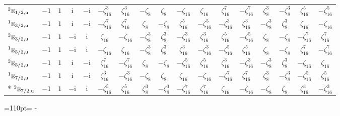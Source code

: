 \documentclass[10pt,a4paper]{article}
\newcommand{\needspace}[1]{\par\penalty-100\begingroup\dimen0=#1\relax\dimen2=\pagegoal
  \advance\dimen2-\pagetotal\ifdim\dimen0>\dimen2\relax\ifdim\dimen2>0pt\vfil\break\fi\fi
  \endgroup}
\numberwithin{equation}{section}
\newcommand{\irr}[1]{\text{\normalfont\scshape #1}}
\newcommand{\conjpair}[1]{{}^{#1}}
\newcommand{\ptag}[1]{\mathrm{#1}}
\newcommand{\iunit}{\mathrm{i}}
\newcommand{\rootunity}[1]{\zeta_{#1}}
\begin{document}
{\begin{longtable}{@{}lcccccccccccccccc@{}}
$\conjpair{2}\irr{e}_{1/2,\ptag{u}}$ & $-1$ & $1$ & $\iunit{}$ & $-\iunit{}$ & $-\rootunity{16}^{3}$ & $\rootunity{16}^{3}$ & $-\rootunity{8}$ & $\rootunity{8}$ & $-\rootunity{16}$ & $\rootunity{16}$ & $\rootunity{16}^{7}$ & $-\rootunity{16}^{7}$ & $\rootunity{8}^{3}$ & $-\rootunity{8}^{3}$ & $\rootunity{16}^{5}$ & $-\rootunity{16}^{5}$\\
$\conjpair{1}\irr{e}_{3/2,\ptag{u}}$ & $-1$ & $1$ & $\iunit{}$ & $-\iunit{}$ & $-\rootunity{16}^{7}$ & $\rootunity{16}^{7}$ & $\rootunity{8}$ & $-\rootunity{8}$ & $\rootunity{16}^{5}$ & $-\rootunity{16}^{5}$ & $-\rootunity{16}^{3}$ & $\rootunity{16}^{3}$ & $-\rootunity{8}^{3}$ & $\rootunity{8}^{3}$ & $\rootunity{16}$ & $-\rootunity{16}$\\
$\conjpair{2}\irr{e}_{3/2,\ptag{u}}$ & $-1$ & $1$ & $-\iunit{}$ & $\iunit{}$ & $\rootunity{16}$ & $-\rootunity{16}$ & $-\rootunity{8}^{3}$ & $\rootunity{8}^{3}$ & $-\rootunity{16}^{3}$ & $\rootunity{16}^{3}$ & $\rootunity{16}^{5}$ & $-\rootunity{16}^{5}$ & $\rootunity{8}$ & $-\rootunity{8}$ & $-\rootunity{16}^{7}$ & $\rootunity{16}^{7}$\\
$\conjpair{1}\irr{e}_{5/2,\ptag{u}}$ & $-1$ & $1$ & $-\iunit{}$ & $\iunit{}$ & $-\rootunity{16}$ & $\rootunity{16}$ & $-\rootunity{8}^{3}$ & $\rootunity{8}^{3}$ & $\rootunity{16}^{3}$ & $-\rootunity{16}^{3}$ & $-\rootunity{16}^{5}$ & $\rootunity{16}^{5}$ & $\rootunity{8}$ & $-\rootunity{8}$ & $\rootunity{16}^{7}$ & $-\rootunity{16}^{7}$\\
$\conjpair{2}\irr{e}_{5/2,\ptag{u}}$ & $-1$ & $1$ & $\iunit{}$ & $-\iunit{}$ & $\rootunity{16}^{7}$ & $-\rootunity{16}^{7}$ & $\rootunity{8}$ & $-\rootunity{8}$ & $-\rootunity{16}^{5}$ & $\rootunity{16}^{5}$ & $\rootunity{16}^{3}$ & $-\rootunity{16}^{3}$ & $-\rootunity{8}^{3}$ & $\rootunity{8}^{3}$ & $-\rootunity{16}$ & $\rootunity{16}$\\
$\conjpair{1}\irr{e}_{7/2,\ptag{u}}$ & $-1$ & $1$ & $\iunit{}$ & $-\iunit{}$ & $\rootunity{16}^{3}$ & $-\rootunity{16}^{3}$ & $-\rootunity{8}$ & $\rootunity{8}$ & $\rootunity{16}$ & $-\rootunity{16}$ & $-\rootunity{16}^{7}$ & $\rootunity{16}^{7}$ & $\rootunity{8}^{3}$ & $-\rootunity{8}^{3}$ & $-\rootunity{16}^{5}$ & $\rootunity{16}^{5}$\\*
$\conjpair{2}\irr{e}_{7/2,\ptag{u}}$ & $-1$ & $1$ & $-\iunit{}$ & $\iunit{}$ & $-\rootunity{16}^{5}$ & $\rootunity{16}^{5}$ & $\rootunity{8}^{3}$ & $-\rootunity{8}^{3}$ & $-\rootunity{16}^{7}$ & $\rootunity{16}^{7}$ & $\rootunity{16}$ & $-\rootunity{16}$ & $-\rootunity{8}$ & $\rootunity{8}$ & $\rootunity{16}^{3}$ & $-\rootunity{16}^{3}$\\
\bottomrule\end{longtable}}
\needspace{110pt}
\end{document}
